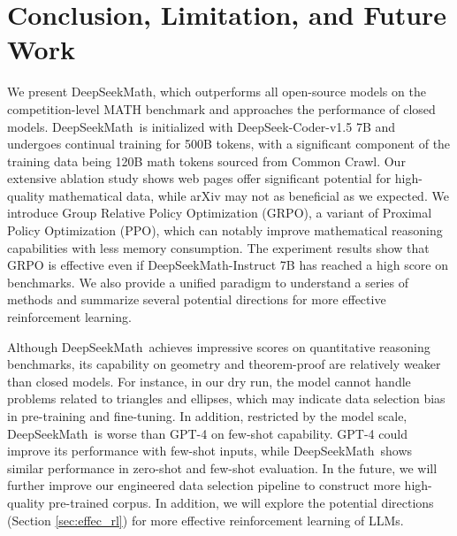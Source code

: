 \section{Conclusion, Limitation, and Future Work} We present DeepSeekMath, which outperforms all open-source models on the competition-level MATH benchmark and approaches the performance of closed models. DeepSeekMath~is initialized with DeepSeek-Coder-v1.5 7B and undergoes continual training for 500B tokens, with a significant component of the training data being 120B math tokens sourced from Common Crawl. Our extensive ablation study shows web pages offer significant potential for high-quality mathematical data, while arXiv may not as beneficial as we expected. We introduce Group Relative Policy Optimization (GRPO), a variant of Proximal Policy Optimization (PPO), which can notably improve mathematical reasoning capabilities with less memory consumption. The experiment results show that GRPO is effective even if DeepSeekMath-Instruct 7B has reached a high score on benchmarks. We also provide a unified paradigm to understand a series of methods and summarize several potential directions for more effective reinforcement learning.

Although DeepSeekMath~achieves impressive scores on quantitative reasoning benchmarks, its capability on geometry and theorem-proof are relatively weaker than closed models. For instance, in our dry run, the model cannot handle problems related to triangles and ellipses, which may indicate data selection bias in pre-training and fine-tuning. In addition, restricted by the model scale, DeepSeekMath~is worse than GPT-4 on few-shot capability. GPT-4 could improve its performance with few-shot inputs, while DeepSeekMath~shows similar performance in zero-shot and few-shot evaluation. In the future, we will further improve our engineered data selection pipeline to construct more high-quality pre-trained corpus. In addition, we will explore the potential directions (Section \ref{sec:effec_rl}) for more effective reinforcement learning of LLMs.


